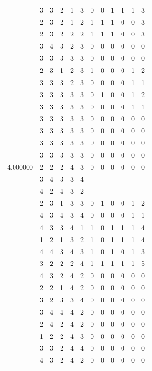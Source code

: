 \documentclass[]{book}
\theoremstyle{definition}
\theoremstyle{definition}
\theoremstyle{definition}
\theoremstyle{remark}
\begin{document}
\begin{table}
{\begin{tabular}[t]{rrrrrrrrrrrr}
 & 3 & 3 & 2 & 1 & 3 & 0 & 0 & 1 & 1 & 1 & 3\\
 & 2 & 3 & 2 & 1 & 2 & 1 & 1 & 1 & 0 & 0 & 3\\
 & 2 & 3 & 2 & 2 & 2 & 1 & 1 & 1 & 0 & 0 & 3\\
 & 3 & 4 & 3 & 2 & 3 & 0 & 0 & 0 & 0 & 0 & 0\\
 & 3 & 3 & 3 & 3 & 3 & 0 & 0 & 0 & 0 & 0 & 0\\
 & 2 & 3 & 1 & 2 & 3 & 1 & 0 & 0 & 0 & 1 & 2\\
 & 3 & 3 & 3 & 2 & 3 & 0 & 0 & 0 & 0 & 1 & 1\\
 & 3 & 3 & 3 & 3 & 3 & 0 & 1 & 0 & 0 & 1 & 2\\
 & 3 & 3 & 3 & 3 & 3 & 0 & 0 & 0 & 0 & 1 & 1\\
 & 3 & 3 & 3 & 3 & 3 & 0 & 0 & 0 & 0 & 0 & 0\\
 & 3 & 3 & 3 & 3 & 3 & 0 & 0 & 0 & 0 & 0 & 0\\
 & 3 & 3 & 3 & 3 & 3 & 0 & 0 & 0 & 0 & 0 & 0\\
 & 3 & 3 & 3 & 3 & 3 & 0 & 0 & 0 & 0 & 0 & 0\\
4.000000 & 2 & 2 & 2 & 4 & 3 & 0 & 0 & 0 & 0 & 0 & 0\\
 & 3 & 4 & 3 & 3 & 4 &  &  &  &  &  & \\
 & 4 & 2 & 4 & 3 & 2 &  &  &  &  &  & \\
 & 2 & 3 & 1 & 3 & 3 & 0 & 1 & 0 & 0 & 1 & 2\\
 & 4 & 3 & 4 & 3 & 4 & 0 & 0 & 0 & 0 & 1 & 1\\
 & 4 & 3 & 3 & 4 & 1 & 1 & 0 & 1 & 1 & 1 & 4\\
 & 1 & 2 & 1 & 3 & 2 & 1 & 0 & 1 & 1 & 1 & 4\\
 & 4 & 4 & 3 & 4 & 3 & 1 & 0 & 1 & 0 & 1 & 3\\
 & 3 & 2 & 2 & 2 & 4 & 1 & 1 & 1 & 1 & 1 & 5\\
 & 4 & 3 & 2 & 4 & 2 & 0 & 0 & 0 & 0 & 0 & 0\\
 & 2 & 2 & 1 & 4 & 2 & 0 & 0 & 0 & 0 & 0 & 0\\
 & 3 & 2 & 3 & 3 & 4 & 0 & 0 & 0 & 0 & 0 & 0\\
 & 3 & 4 & 4 & 4 & 2 & 0 & 0 & 0 & 0 & 0 & 0\\
 & 2 & 4 & 2 & 4 & 2 & 0 & 0 & 0 & 0 & 0 & 0\\
 & 1 & 2 & 2 & 4 & 3 & 0 & 0 & 0 & 0 & 0 & 0\\
 & 3 & 3 & 2 & 4 & 4 & 0 & 0 & 0 & 0 & 0 & 0\\
 & 4 & 3 & 2 & 4 & 2 & 0 & 0 & 0 & 0 & 0 & 0\\

\end{tabular}}
\end{table}
\end{document}
